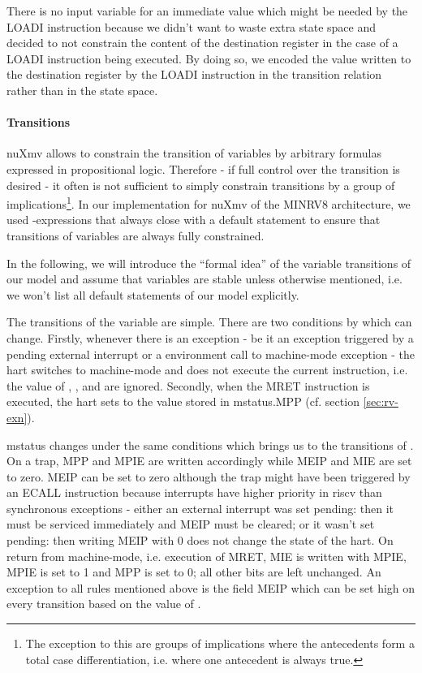 There is no input variable for an immediate value which might be needed by the LOADI instruction because we didn't want to waste extra state space and decided to not constrain the content of the destination register in the case of a LOADI instruction being executed.
By doing so, we encoded the value written to the destination register by the LOADI instruction in the transition relation rather than in the state space.

\paragraph{Transitions}
nuXmv allows to constrain the transition of variables by arbitrary formulas expressed in propositional logic.
Therefore - if full control over the transition is desired - it often is not sufficient to simply constrain transitions by a group of implications\footnote{%
    The exception to this are groups of implications where the antecedents form a total case differentiation, i.e. where one antecedent is always true.
}.
In our implementation for nuXmv of the MINRV8 architecture, we used -expressions that always close with a default statement to ensure that transitions of variables are always fully constrained.

In the following, we will introduce the \enquote{formal idea} of the variable transitions of our model and assume that variables are stable unless otherwise mentioned, i.e. we won't list all default statements of our model explicitly.

The transitions of the  variable are simple.
There are two conditions by which  can change.
Firstly, whenever there is an exception - be it an exception triggered by a pending external interrupt or a environment call to machine-mode exception - the \gls{hart} switches to machine-mode and does not execute the current instruction, i.e. the value of , ,  and  are ignored.
Secondly, when the MRET instruction is executed, the \gls{hart} sets  to the value stored in \gls{mstatus}.MPP (cf. section \ref{sec:rv-exn}).

\gls{mstatus} changes under the same conditions which brings us to the transitions of .
On a trap, MPP and MPIE are written accordingly while MEIP and MIE are set to zero.
MEIP can be set to zero although the trap might have been triggered by an ECALL instruction because interrupts have higher priority in \gls{riscv} than synchronous exceptions - either an external interrupt was set pending: then it must be serviced immediately and MEIP must be cleared; or it wasn't set pending: then writing MEIP with 0 does not change the state of the \gls{hart}.
On return from machine-mode, i.e. execution of MRET, MIE is written with MPIE, MPIE is set to 1 and MPP is set to 0; all other bits are left unchanged.
An exception to all rules mentioned above is the field MEIP which can be set high on every transition based on the value of .

